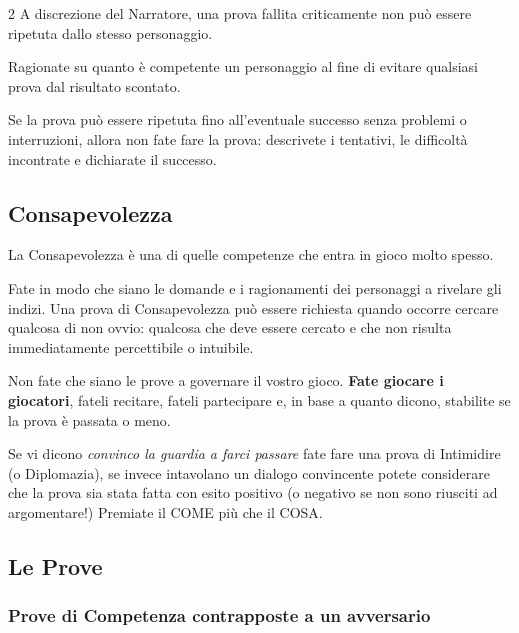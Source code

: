 \begin{multicols}{2}
A discrezione del Narratore, una prova fallita criticamente non può essere ripetuta dallo stesso personaggio.

Ragionate su quanto è competente un personaggio al fine di evitare qualsiasi prova dal risultato scontato.

\begin{narratore}
Se la prova può essere ripetuta fino all'eventuale successo senza problemi o interruzioni, allora non fate fare la prova: descrivete i tentativi, le difficoltà incontrate e dichiarate il successo.
\end{narratore}

\subsection{Consapevolezza}\label{consapevolezza2}

La Consapevolezza è una di quelle competenze che entra in gioco molto spesso.

Fate in modo che siano le domande e i ragionamenti dei personaggi a rivelare gli indizi. Una prova di Consapevolezza può essere richiesta quando occorre cercare qualcosa di non ovvio: qualcosa che deve essere cercato e che non risulta immediatamente percettibile o intuibile.

\begin{narratore}
Non fate che siano le prove a governare il vostro gioco. \textbf{Fate giocare i giocatori}, fateli recitare, fateli partecipare e, in base a quanto dicono, stabilite se la prova è passata o meno.

Se vi dicono \emph{convinco la guardia a farci passare} fate fare una prova di Intimidire (o Diplomazia), se invece intavolano un dialogo convincente potete considerare che la prova sia stata fatta con esito positivo (o negativo se non sono riusciti ad argomentare!) Premiate il COME più che il COSA.
\end{narratore}

\subsection{Le Prove}\label{proveopposte}

\subsubsection{Prove di Competenza contrapposte a un avversario}


\end{multicols}
